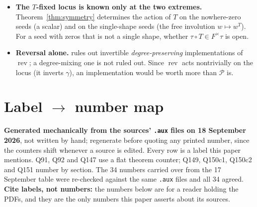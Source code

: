 \documentclass[11pt]{article}
\theoremstyle{definition}
\theoremstyle{remark}
\newcommand{\Fld}{F}                     %
\newcommand{\PH}{\mathcal{P}}            %
\newcommand{\rev}{\operatorname{rev}}
\begin{document}
\begin{itemize}
\item[\textbf{(H2c)}] \textbf{The $T$-fixed locus is known only at the two extremes.}
  Theorem~\ref{thm:symmetry} determines the action of $T$ on the nowhere-zero seeds (a scalar)
  and on the single-shape seeds (the free involution $w\mapsto w^{T}$).  For a seed with zeros
  that is not a single shape, whether $\tau\circ T\in\Fld^{\times}\tau$ is open.

\item[\textbf{(H2d)}] \textbf{Reversal alone.}  \cite[\texttt{prop:norev}]{Q151} rules out
  invertible \emph{degree-preserving} implementations of $\rev$; a degree-mixing one is not
  ruled out.  Since $\rev$ acts nontrivially on the locus (it inverts $\gamma$), an
  implementation would be worth more than $\PH$ is.
\end{itemize}

\appendix
\section{Label $\to$ number map}\label{app:labels}

\textbf{Generated mechanically from the sources' \texttt{.aux} files on 18 September 2026},
not written by hand; regenerate before quoting any printed number, since the counters shift
whenever a source is edited.  Every row is a label this paper mentions.  Q91, Q92 and Q147 use
a flat theorem counter; Q149, Q150c1, Q150c2 and Q151 number by section.  The 34 numbers
carried over from the 17 September table were re-checked against the same \texttt{.aux} files
and all 34 agreed.  \textbf{Cite labels, not numbers:} the numbers below are for a reader
holding the PDFs, and they are the only numbers this paper asserts about its sources.
\end{document}

